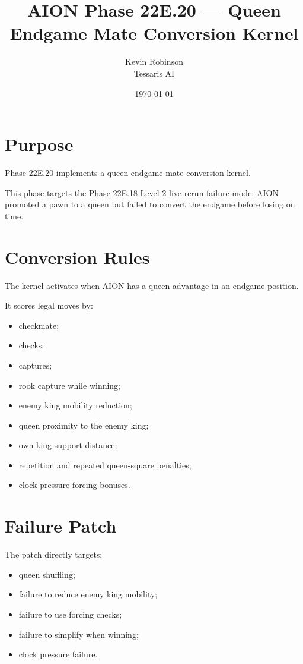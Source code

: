 \documentclass[11pt,a4paper]{article}
\title{\textbf{AION Phase 22E.20 --- Queen Endgame Mate Conversion Kernel}}
\author{Kevin Robinson\\Tessaris AI}
\date{\today}
\begin{document}
\maketitle

\section{Purpose}

Phase 22E.20 implements a queen endgame mate conversion kernel.

This phase targets the Phase 22E.18 Level-2 live rerun failure mode: AION promoted a pawn to a queen but failed to convert the endgame before losing on time.

\section{Conversion Rules}

The kernel activates when AION has a queen advantage in an endgame position.

It scores legal moves by:

\begin{itemize}[leftmargin=*]
  \item checkmate;
  \item checks;
  \item captures;
  \item rook capture while winning;
  \item enemy king mobility reduction;
  \item queen proximity to the enemy king;
  \item own king support distance;
  \item repetition and repeated queen-square penalties;
  \item clock pressure forcing bonuses.
\end{itemize}

\section{Failure Patch}

The patch directly targets:

\begin{itemize}[leftmargin=*]
  \item queen shuffling;
  \item failure to reduce enemy king mobility;
  \item failure to use forcing checks;
  \item failure to simplify when winning;
  \item clock pressure failure.
\end{itemize}
\end{document}
